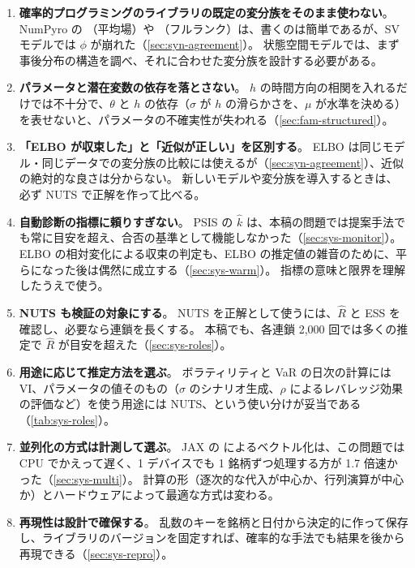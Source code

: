 \begin{enumerate}
  \item \textbf{確率的プログラミングのライブラリの既定の変分族をそのまま使わない}。
    NumPyro の （平均場）や （フルランク）は、書くのは簡単であるが、SV モデルでは $\phi$ が崩れた（\cref{sec:syn-agreement}）。
    状態空間モデルでは、まず事後分布の構造を調べ、それに合わせた変分族を設計する必要がある。
  \item \textbf{パラメータと潜在変数の依存を落とさない}。
    $h$ の時間方向の相関を入れるだけでは不十分で、$\theta$ と $h$ の依存（$\sigma$ が $h$ の滑らかさを、$\mu$ が水準を決める）を表せないと、パラメータの不確実性が失われる（\cref{sec:fam-structured}）。
  \item \textbf{「ELBO が収束した」と「近似が正しい」を区別する}。
    ELBO は同じモデル・同じデータでの変分族の比較には使えるが（\cref{sec:syn-agreement}）、近似の絶対的な良さは分からない。
    新しいモデルや変分族を導入するときは、必ず NUTS で正解を作って比べる。
  \item \textbf{自動診断の指標に頼りすぎない}。
    PSIS の $\hat k$ は、本稿の問題では提案手法でも常に目安を超え、合否の基準として機能しなかった（\cref{sec:sys-monitor}）。
    ELBO の相対変化による収束の判定も、ELBO の推定値の雑音のために、平らになった後は偶然に成立する（\cref{sec:sys-warm}）。
    指標の意味と限界を理解したうえで使う。
  \item \textbf{NUTS も検証の対象にする}。
    NUTS を正解として使うには、$\hat R$ と ESS を確認し、必要なら連鎖を長くする。
    本稿でも、各連鎖 2,000 回では多くの推定で $\hat R$ が目安を超えた（\cref{sec:sys-roles}）。
  \item \textbf{用途に応じて推定方法を選ぶ}。
    ボラティリティと VaR の日次の計算には VI、パラメータの値そのもの（$\sigma$ のシナリオ生成、$\rho$ によるレバレッジ効果の評価など）を使う用途には NUTS、という使い分けが妥当である（\cref{tab:sys-roles}）。
  \item \textbf{並列化の方式は計測して選ぶ}。
    JAX の  によるベクトル化は、この問題では CPU でかえって遅く、1 デバイスでも 1 銘柄ずつ処理する方が 1.7 倍速かった（\cref{sec:sys-multi}）。
    計算の形（逐次的な代入が中心か、行列演算が中心か）とハードウェアによって最適な方式は変わる。
  \item \textbf{再現性は設計で確保する}。
    乱数のキーを銘柄と日付から決定的に作って保存し、ライブラリのバージョンを固定すれば、確率的な手法でも結果を後から再現できる（\cref{sec:sys-repro}）。
\end{enumerate}

